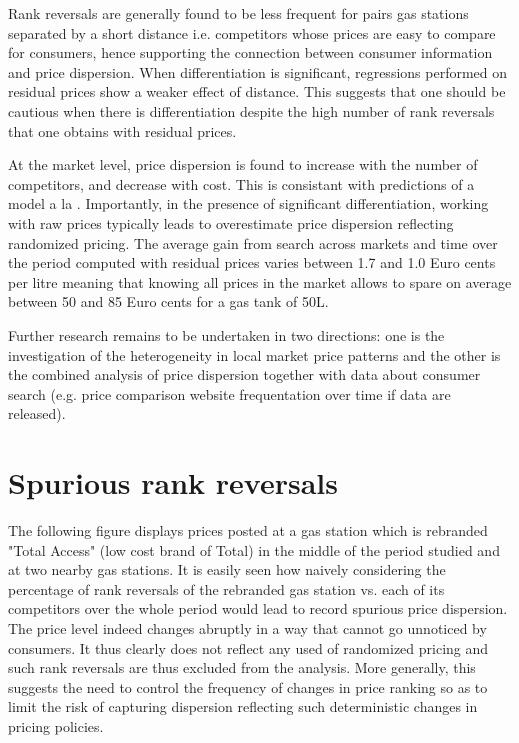 \documentclass[11pt]{article}
\begin{document}
Rank reversals are generally found to be less frequent for pairs gas stations separated by a short distance i.e. competitors whose prices are easy to compare for consumers, hence supporting the connection between consumer information and price dispersion. When differentiation is significant, regressions performed on residual prices show a weaker effect of distance. This suggests that one should be cautious when there is differentiation despite the high number of rank reversals that one obtains with residual prices.

At the market level, price dispersion is found to increase with the number of competitors, and decrease with cost. This is consistant with predictions of a model a la \cite{VAR80}. Importantly, in the presence of significant differentiation, working with raw prices typically leads to overestimate price dispersion reflecting randomized pricing. The average gain from search across markets and time over the period computed with residual prices varies between 1.7 and 1.0 Euro cents per litre meaning that knowing all prices in the market allows to spare on average between 50 and 85 Euro cents for a gas tank of 50L.

Further research remains to be undertaken in two directions: one is the investigation of the heterogeneity in local market price patterns and the other is the combined analysis of price dispersion together with data about consumer search (e.g. price comparison website frequentation over time if data are released).

\newpage



\newpage

\appendix

\section{Spurious rank reversals}

The following figure displays prices posted at a gas station which is rebranded "Total Access" (low cost brand of Total) in the middle of the period studied and at two nearby gas stations. It is easily seen how naively considering the percentage of rank reversals of the rebranded gas station vs. each of its competitors over the whole period would lead to record spurious price dispersion. The price level indeed changes abruptly in a way that cannot go unnoticed by consumers. It thus clearly does not reflect any used of randomized pricing and such rank reversals are thus excluded from the analysis. More generally, this suggests the need to control the frequency of changes in price ranking so as to limit the risk of capturing dispersion reflecting such deterministic changes in pricing policies.
\end{document}
